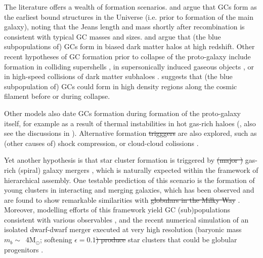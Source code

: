\documentclass[a4paper,fleqn,usenatbib]{mnras}
\newcommand{\Sun}[0]{\ensuremath{_{\odot}}}
\providecommand{\DIFadd}[1]{{\protect\color{blue}\uwave{#1}}} %
\providecommand{\DIFdel}[1]{{\protect\color{red}\sout{#1}}}                      %
\providecommand{\DIFaddbegin}{} %
\providecommand{\DIFaddend}{} %
\providecommand{\DIFdelbegin}{} %
\providecommand{\DIFdelend}{} %
\newcommand{\DIFscaledelfig}{0.5}
\newlength{\DIFdelgraphicswidth} %
\newlength{\DIFdelgraphicsheight} %
\newcommand{\DIFaddincludegraphics}[2][]{{\color{blue}\fbox{\DIFOincludegraphics[#1]{#2}}}} %
\newcommand{\DIFdelincludegraphics}[2][]{%
\sbox{\DIFdelgraphicsbox}{\DIFOincludegraphics[#1]{#2}}%
\settoboxwidth{\DIFdelgraphicswidth}{\DIFdelgraphicsbox} %
\settoboxtotalheight{\DIFdelgraphicsheight}{\DIFdelgraphicsbox} %
\scalebox{\DIFscaledelfig}{%
\parbox[b]{\DIFdelgraphicswidth}{\usebox{\DIFdelgraphicsbox}\\[-\baselineskip] \rule{\DIFdelgraphicswidth}{0em}}\llap{\resizebox{\DIFdelgraphicswidth}{\DIFdelgraphicsheight}{%
\setlength{\unitlength}{\DIFdelgraphicswidth}%
\begin{picture}(1,1)%
\thicklines\linethickness{2pt} %
{\color[rgb]{1,0,0}\put(0,0){\framebox(1,1){}}}%
{\color[rgb]{1,0,0}\put(0,0){\line( 1,1){1}}}%
{\color[rgb]{1,0,0}\put(0,1){\line(1,-1){1}}}%
\end{picture}%
}\hspace*{3pt}}} %
} %
\DeclareRobustCommand{\DIFaddbegin}{\DIFOaddbegin \let\includegraphics\DIFaddincludegraphics} %
\DeclareRobustCommand{\DIFaddend}{\DIFOaddend \let\includegraphics\DIFOincludegraphics} %
\DeclareRobustCommand{\DIFdelbegin}{\DIFOdelbegin \let\includegraphics\DIFdelincludegraphics} %
\DeclareRobustCommand{\DIFdelend}{\DIFOaddend \let\includegraphics\DIFOincludegraphics} %
\begin{document}
The literature offers a wealth of formation scenarios. \citet{1968ApJ...154..891P}
and \citet{1984ApJ...277..470P} argue that GCs form as the earliest bound
structures in the Universe (i.e. prior to formation of the main galaxy), 
noting that the Jeans length and mass shortly after recombination is consistent
with typical GC masses and sizes. \citet{2005MNRAS.364..367D} and \citet{
2009ApJ...706L.192B} argue that (the blue subpopulations of) GCs form in \DIFaddbegin \DIFadd{radially
}\DIFaddend biased dark matter halos at high redshift. Other recent hypotheses of GC formation 
prior to collapse of the proto-galaxy include formation in colliding supershells 
\citep{2017Ap&SS.362..183R}, in supersonically induced gaseous objects
\citep{2019arXiv190408941C}, or in high-speed collisions of dark matter subhaloes
\citep{2019arXiv190508951M}. \citet{2017MNRAS.472.3120B} suggests
that (the blue subpopulation of) GCs could form in high density regions along
the cosmic filament before or during collapse.

Other models also date GCs formation during formation of the proto-galaxy itself,
for example as a result of thermal instabilities in hot gas-rich haloes 
(\citealt{1985ApJ...298...18F}, also see the discussions in \citealt{
1990ApJ...363..488K}). Alternative formation \DIFdelbegin \DIFdel{trigggers }\DIFdelend \DIFaddbegin \DIFadd{triggers }\DIFaddend are also explored, such as 
(other causes of) shock compression, or cloud-cloud colissions \citep[e.g.][]{
1980glcl.conf..301G, 1992ApJ...400..265M, 1994ApJ...429..177H, 1995ApJ...442..618V,
1996ASPC...92..241L, 2001ApJ...560..592C}. 

Yet another hypothesis is that star cluster formation is triggered by \DIFdelbegin \DIFdel{(major 
) 
}\DIFdelend \DIFaddbegin \DIFadd{major 
}\DIFaddend gas-rich (spiral) galaxy mergers \citep{1987nngp.proc...18S, 1992ApJ...384...50A},
which is naturally expected within the framework of hierarchical assembly. One
testable prediction of this scenario is the formation of young clusters in
interacting and merging galaxies, which has been observed and are found to show 
remarkable similarities with \DIFdelbegin \DIFdel{globulars in the Milky Way }\DIFdelend \DIFaddbegin \DIFadd{GCs in the MW }\DIFaddend \citep[e.g.][]{
1995AJ....109..960W, 1996AJ....112..416H, 1999AJ....118..752Z, 1999AJ....118.1551W}.
Moreover, modelling efforts of this framework yield GC (sub)populations consistent 
with various observables \citep[e.g.][]{2010ApJ...718.1266M, 2018MNRAS.480.2343C}, 
and the recent numerical simulation of an isolated dwarf-dwarf merger executed at 
very high resolution (baryonic mass $m_b \sim$~4M\Sun; softening $\epsilon = 0.1$\DIFdelbegin \DIFdel{) 
produce }\DIFdelend \DIFaddbegin \DIFadd{~pc) 
produces }\DIFaddend star clusters that could be globular progenitors \citep{
2019arXiv190509840L}.
\end{document}
